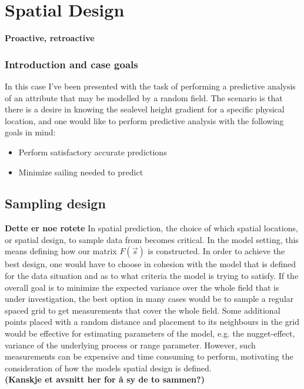 \section{Spatial Design}
\textbf{Proactive, retroactive} 

\subsubsection{Introduction and case goals} \label{subsub:goals}
In this case I've been presented with the task of performing a predictive analysis of an attribute that may be modelled by a random field. The scenario is that there is a desire in knowing the sealevel height gradient for a specific physical location, and one would like to perform predictive analysis with the following goals in mind:
\begin{itemize} 
\item Perform satisfactory accurate predictions
\item Minimize sailing needed to predict
\end{itemize} 

\subsection{Sampling design} 
\label{sec:sampling_design}
\textbf{Dette er noe rotete}
In spatial prediction, the choice of which spatial locations, or spatial design, to sample data from becomes critical. In the model setting, this means defining how our matrix $F(\vec{s})$ is constructed. In order to achieve the best design, one would have to choose in cohesion with the model that is defined for the data situation and as to what criteria the model is trying to satisfy. If the overall goal is to minimize the expected variance over the whole field that is under investigation, the best option in many cases would be to sample a regular spaced grid to get measurements that cover the whole field. Some additional points placed with a random distance and placement to its neighbours in the grid would be effective for estimating parameters of the model, e.g. the nugget-effect, variance of the underlying process or range parameter. However, such measurements can be expensive and time consuming to perform, motivating the consideration of how the models spatial design is defined. \\

\textbf{(Kanskje et avsnitt her for å sy de to sammen?)} \\

